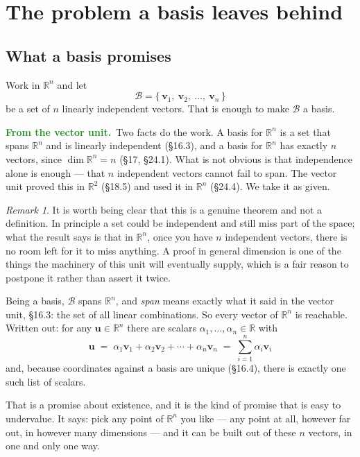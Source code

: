 \documentclass[11pt]{article}
\theoremstyle{plain}
\theoremstyle{definition}
\theoremstyle{remark}
\newtheorem*{rmk}{Remark}
\newcommand{\lookback}{\par\smallskip\noindent
  \textbf{\sffamily\textcolor{ForestGreen}{From the vector unit.}}\ \ignorespaces}
\newcommand{\R}{\mathbb{R}}
\newcommand{\vc}[1]{\mathbf{#1}}        %
\newcommand{\bas}{\mathcal{B}}
\begin{document}
\section{The problem a basis leaves behind}
\subsection{What a basis promises}
Work in $\R^{n}$ and let
\[
  \bas = \{\,\vc{v}_1,\ \vc{v}_2,\ \dots,\ \vc{v}_n\,\}
\]
be a set of $n$ linearly independent vectors. That is enough to make $\bas$ a
basis.

\lookback Two facts do the work. A basis for $\R^{n}$ is a set that spans
$\R^{n}$ and is linearly independent (\S16.3), and a basis for $\R^{n}$ has
exactly $n$ vectors, since $\dim\R^{n}=n$ (\S17, \S24.1). What is not obvious is
that independence alone is enough --- that $n$ independent vectors cannot fail
to span. The vector unit proved this in $\R^{2}$ (\S18.5) and used it in
$\R^{n}$ (\S24.4). We take it as given.

\begin{rmk}
It is worth being clear that this is a genuine theorem and not a definition. In
principle a set could be independent and still miss part of the space; what the
result says is that in $\R^{n}$, once you have $n$ independent vectors, there is
no room left for it to miss anything. A proof in general dimension is one of the
things the machinery of this unit will eventually supply, which is a fair reason
to postpone it rather than assert it twice.
\end{rmk}

\noindent Being a basis, $\bas$ spans $\R^{n}$, and \emph{span} means exactly
what it said in the vector unit, \S16.3: the set of all linear combinations. So
every vector of $\R^{n}$ is reachable. Written out: for any $\vc{u}\in\R^{n}$
there are scalars $\alpha_1,\dots,\alpha_n\in\R$ with
\[
  \boxed{\;\vc{u}
  \;=\; \alpha_1\vc{v}_1 + \alpha_2\vc{v}_2 + \cdots + \alpha_n\vc{v}_n
  \;=\; \sum_{i=1}^{n}\alpha_i\vc{v}_i \;}
\]
and, because coordinates against a basis are unique (\S16.4), there is exactly
one such list of scalars.

That is a promise about existence, and it is the kind of promise that is easy to
undervalue. It says: pick any point of $\R^{n}$ you like --- any point at all,
however far out, in however many dimensions --- and it can be built out of these
$n$ vectors, in one and only one way.
\end{document}
